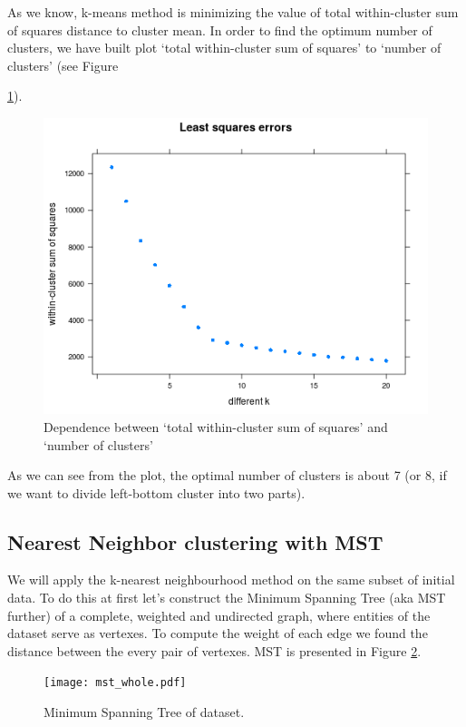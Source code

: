 As we know, k-means method is minimizing the value of total within-cluster sum of squares distance to cluster mean. 
In order to find the optimum number of clusters, we have built plot 
`total within-cluster sum of squares' to `number of clusters' (see Figure {\ref{fig:totalwithin-to-k}).

\begin{figure}[h]
	\centering
	\begin{minipage}[h]{0.49\linewidth}
\includegraphics[width=\linewidth]{images/totalwithin}
	\end{minipage}
	\caption{Dependence between `total within-cluster sum of squares' and `number of clusters'}
	\label{fig:totalwithin-to-k}	
\end{figure}

As we can see from the plot, the optimal number of clusters is about 7 (or 8, if we want to divide left-bottom cluster into two parts).

\subsection{Nearest Neighbor clustering with MST}
	We will apply the k-nearest neighbourhood method on the same subset of initial data. To do this at first let's construct the Minimum Spanning Tree (aka MST further) of a complete, weighted and undirected graph, where entities of the dataset serve as vertexes. To compute the weight of each edge we found the distance between the every pair of vertexes. MST is presented in Figure \ref{fig:mst_whole}.

\begin{figure}[h]
	\centering
	\begin{minipage}[h]{0.49\linewidth}
\texttt{[image: mst\_whole.pdf]}
	\end{minipage}
	\caption{Minimum Spanning Tree of dataset.}
	\label{fig:mst_whole}	
\end{figure}	
	
}
